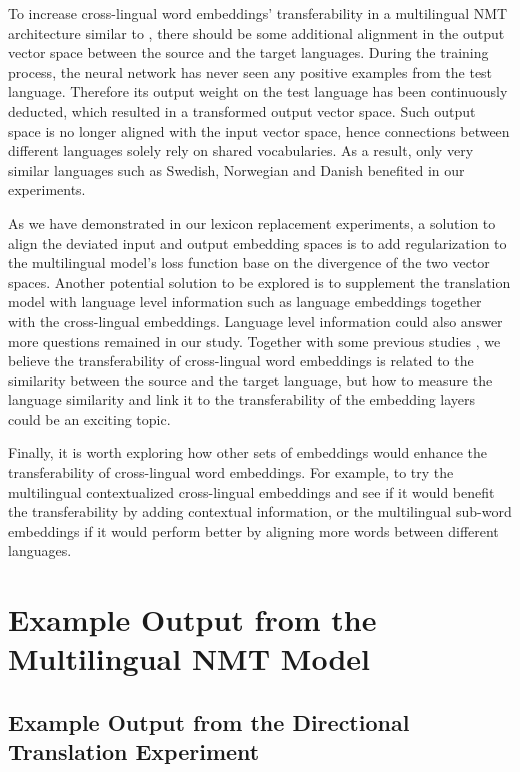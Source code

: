 \documentclass[thesis,fonts=libertine]{cluu}
\begin{document}
To increase cross-lingual word embeddings' transferability in a multilingual NMT architecture similar to \textcite{Johnson:2016aa}, there should be some additional alignment in the output vector space between the source and the target languages. During the training process, the neural network has never seen any positive examples from the test language. Therefore its output weight on the test language has been continuously deducted, which resulted in a transformed output vector space. Such output space is no longer aligned with the input vector space, hence connections between different languages solely rely on shared vocabularies. As a result, only very similar languages such as Swedish, Norwegian and Danish benefited in our experiments.

As we have demonstrated in our lexicon replacement experiments, a solution to align the deviated input and output embedding spaces is to add regularization to the multilingual model's loss function base on the divergence of the two vector spaces. Another potential solution to be explored is to supplement the translation model with language level information such as language embeddings \parencite{littell-etal-2017-uriel,malaviya-etal-2017-learning} together with the cross-lingual embeddings. Language level information could also answer more questions remained in our study. Together with some previous studies \parencite{Qi:2018aa,aji-etal-2020-neural}, we believe the transferability of cross-lingual word embeddings is related to the similarity between the source and the target language, but how to measure the language similarity and link it to the transferability of the embedding layers could be an exciting topic.

Finally, it is worth exploring how other sets of embeddings would enhance the transferability of cross-lingual word embeddings. For example, to try the multilingual contextualized cross-lingual embeddings \textcite{devlin-etal-2019-bert} and see if it would benefit the transferability by adding contextual information, or the multilingual sub-word embeddings \textcite{Heinzerling:2017aa} if it would perform better by aligning more words between different languages.

\appendix
\chapter{Example Output from the Multilingual NMT Model}
\label{chap:example_output}

\section{Example Output from the Directional Translation Experiment}
\label{sec:directional_output}
\end{document}
